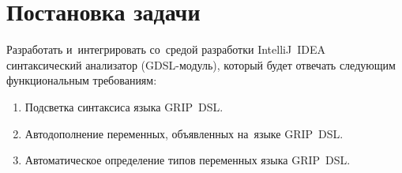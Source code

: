 \section{Постановка задачи} \label{sub21}

Разработать и~интегрировать со~средой разработки IntelliJ~IDEA синтаксический анализатор (GDSL-модуль), который будет отвечать следующим функциональным требованиям:

\begin{enumerate} 
\item{Подсветка синтаксиса языка GRIP~DSL.}
\item{Автодополнение переменных, объявленных на~языке GRIP~DSL.}
\item{Автоматическое определение типов переменных языка GRIP~DSL.}
\end{enumerate} 